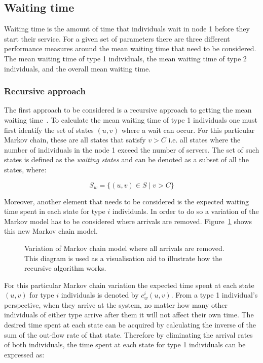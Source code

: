 \subsection{Waiting time}\label{sec:waiting_time}
Waiting time is the amount of time that individuals wait in node 1 before
they start their service.
For a given set of parameters there are three different performance measures
around the mean waiting time that need to be considered.
The mean waiting time of type 1 individuals, the mean waiting time of type 2
individuals, and the overall mean waiting time.

\subsubsection{Recursive approach}\label{sec:recursive_waiting_time}

The first approach to be considered is a recursive approach to getting the
mean waiting time~\cite{banjevic1996recursive}.
To calculate the mean waiting time of type 1 individuals one must first
identify the set of states \((u, v)\) where a wait can occur.
For this particular Markov chain, these are all states that satisfy \(v > C\)
i.e. all states where the number of individuals in the node 1 exceed
the number of servers.
The set of such states is defined as the \textit{waiting states} and can be
denoted as a subset of all the states, where:

\begin{equation} \label{eq:waiting_states}
    S_w = \{(u, v) \in S \; | \; v > C \}
\end{equation}

Moreover, another element that needs to be considered is the expected waiting
time spent in each state for type \(i\) individuals.
In order to do so a variation of the Markov model has to be considered where
arrivals are removed.
Figure~\ref{fig:markov_variation_no_arrivals} shows this new Markov chain model.

\begin{figure}[H]
    \centering
    
    \caption{Variation of Markov chain model where all arrivals are removed.
    This diagram is used as a visualisation aid to illustrate how the recursive
    algorithm works.}
    \label{fig:markov_variation_no_arrivals}
\end{figure}

For this particular Markov chain variation the expected time spent at
each state \((u,v)\) for type \(i\) individuals is denoted by \(c_w^i(u,v)\).
From a type 1 individual's perspective, when they arrive at the system, no
matter how many other individuals of either type arrive after them it will not
affect their own time.
The desired time spent at each state can be acquired by calculating the inverse
of the sum of the out-flow rate of that state.
Therefore by eliminating the arrival rates of both individuals, the time spent
at each state for type 1 individuals can be expressed as:

